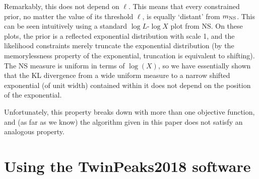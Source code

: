 \documentclass[entropy,article,submit,moreauthors,pdftex,10pt,a4paper]{Definitions/mdpi}
\begin{document}
Remarkably, this does not depend on $\ell$. This means that every constrained
prior, no matter the value of its threshold $\ell$, is equally `distant'
from $m_{\rm NS}$. This can be seen intuitively using a standard
$\log L$-$\log X$ plot from NS. On these plots, the prior is a reflected
exponential distribution with scale 1, and the likelihood constraints
merely truncate the exponential distribution (by the memorylessness property
of the exponential, truncation is equivalent to shifting). The NS measure
is uniform in terms of $\log(X)$, so we have essentially shown that the KL
divergence from a wide uniform measure to a narrow shifted
exponential (of unit width) contained within it does not depend on the
position of the exponential.

Unfortunately, this property breaks down with more than
one objective function, and (as far as we know) the algorithm given in this
paper does not satisfy an analogous property.

\section{Using the TwinPeaks2018 software}






%


\end{document}
